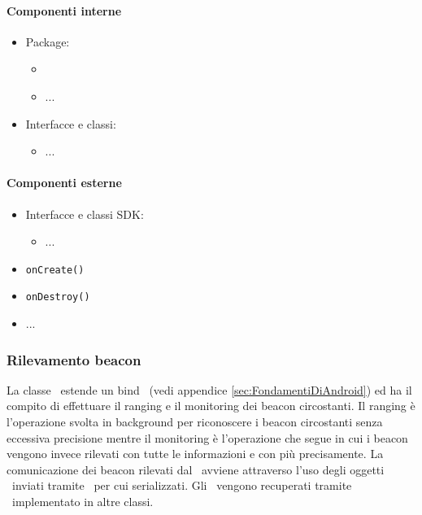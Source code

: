 \documentclass[../Funzionalita.tex]{subfiles}
\begin{document}
			\paragraph*{Componenti interne}
			\begin{itemize}
			
				\item Package:
				\begin{itemize}
					\item[]
					\item[] ...
				\end{itemize}
				
				\item Interfacce e classi:
				\begin{itemize}
					\item[] ...
				\end{itemize}
				
			\end{itemize}
			
			
			\paragraph*{Componenti esterne}
			
			\begin{itemize}
				\item Interfacce e classi SDK:
				\begin{itemize}
					\item[] ...
				\end{itemize}
			\end{itemize}
			
			\begin{itemize}[label={--}]
				\item \verb|onCreate()| 
				\item \verb|onDestroy()|
				\item ...
			\end{itemize}
			
		\subsubsection{Rilevamento beacon}
			La classe \BeaconManagerAdapter\ estende un bind \Service\ (vedi appendice \ref{sec:FondamentiDiAndroid}) ed ha il compito di effettuare il ranging e il monitoring dei beacon circostanti. Il ranging è l'operazione svolta in background per riconoscere i beacon circostanti senza eccessiva precisione mentre il monitoring è l'operazione che segue in cui i beacon vengono invece rilevati con tutte le informazioni e con più precisamente.
			La comunicazione dei beacon rilevati dal \model\ avviene attraverso l'uso degli oggetti \MyBeacon\ inviati tramite \Intent\ per cui serializzati. Gli \Intent\ vengono recuperati tramite \BroadcastReceiver\ implementato in altre classi.
			
\end{document}
